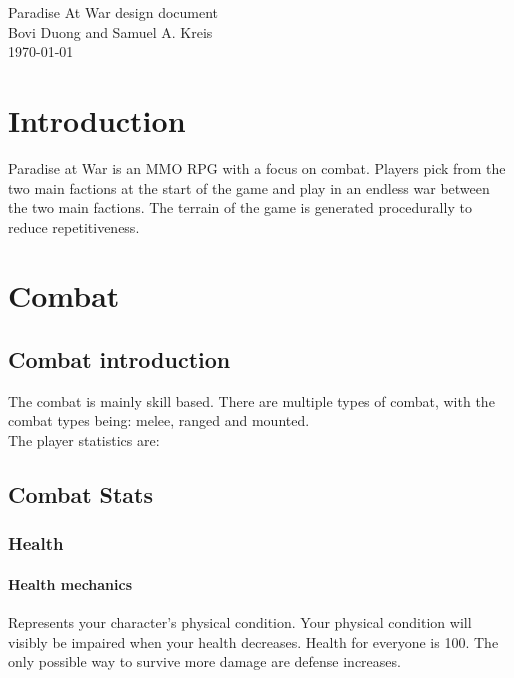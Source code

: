 \documentclass{report}
\begin{document}
\vspace*{256pt}
\begin{center}
    {\huge Paradise At War design document}\\[8pt]
    {\large Bovi Duong and Samuel A. Kreis}\\[4pt]
    \today
\end{center}

\newpage

\tableofcontents
\listofmyequations

\newpage

\chapter{Introduction}

Paradise at War is an MMO RPG with a focus on combat. Players pick from the two main factions at the start of the game and play in an endless war between the two main factions. The terrain of the game is generated procedurally to reduce repetitiveness.

\chapter{Combat}



\section{Combat introduction}

The combat is mainly skill based. There are multiple types of combat, with the combat types being: melee, ranged and mounted. \\
The player statistics are:

\section{Combat Stats}
    \subsection{Health}

    \subsubsection{Health mechanics}
         Represents your character’s physical condition. Your physical            condition will visibly be impaired when your health decreases.
        Health for everyone is 100. The only possible way to survive more damage are defense increases. 
\end{document}
